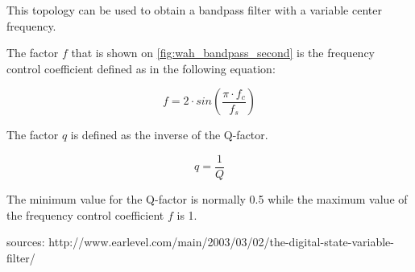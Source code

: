 This topology can be used to obtain a bandpass filter with a variable center frequency. 

The factor $f$ that is shown on \autoref{fig:wah_bandpass_second} is the frequency control coefficient defined as in the following equation:

\begin{equation}
      f = 2 \cdot sin(\frac{\pi \cdot f_{c}}{f_{s}})
\end{equation}

The factor $q$ is defined as the inverse of the Q-factor.

\begin{equation}
			q = \frac{1}{Q}
\end{equation}

The minimum value for the Q-factor is normally 0.5 while the maximum value of the frequency control coefficient $f$ is 1. 


sources:
http://www.earlevel.com/main/2003/03/02/the-digital-state-variable-filter/
